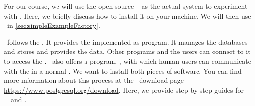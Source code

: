 %
%
\label{sec:installingPostgres}%
%
For our course, we will use the open source  \postgresql~\cite{TA2024DDAMWPAM,FP2023LP,OH2017PUAR,B2024PELUYDW} as the actual system to experiment with .
Here, we briefly discuss how to install it on your machine.
We will then use \postgresql\ in \cref{sec:simpleExampleFactory}.

\postgresql\ follows the .
It provides the  implemented as  program.
It manages the databases and stores and provides the data.
Other programs and the users can connect to it to access the .
\postgresql\ also offers a  program, \psql, with which human users can communicate with the   in a normal .
We want to install both pieces of software.
You can find more information about this process at the \postgresql\ download page \url{https://www.postgresql.org/download}.
Here, we provide step-by-step guides for \ubuntu\ \linux\ and \microsoftWindows.%
%
%
%
%
\endhsection%
%
